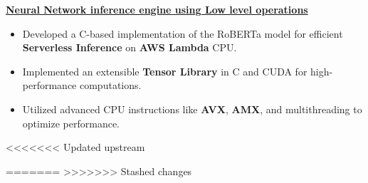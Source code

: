 \documentclass[10pt,a4]{article}
\begin{document}
{\begin{flushleft}
    \vspace{0.5mm}
    \item \textbf{\large \href{https://github.com/narain1/roberta.c}{Neural Network inference engine using Low level operations}}
        \vspace{0.5mm}
        \begin{itemize}
            \item Developed a C-based implementation of the RoBERTa model for efficient \textbf{Serverless Inference} on \textbf{AWS Lambda} CPU.
            \item Implemented an extensible \textbf{Tensor Library} in C and CUDA for high-performance computations.
            \item Utilized advanced CPU instructions like \textbf{AVX}, \textbf{AMX}, and multithreading to optimize performance.
        \end{itemize}
        

\end{flushleft}
<<<<<<< Updated upstream
}
	
=======
>>>>>>> Stashed changes
\end{document}
